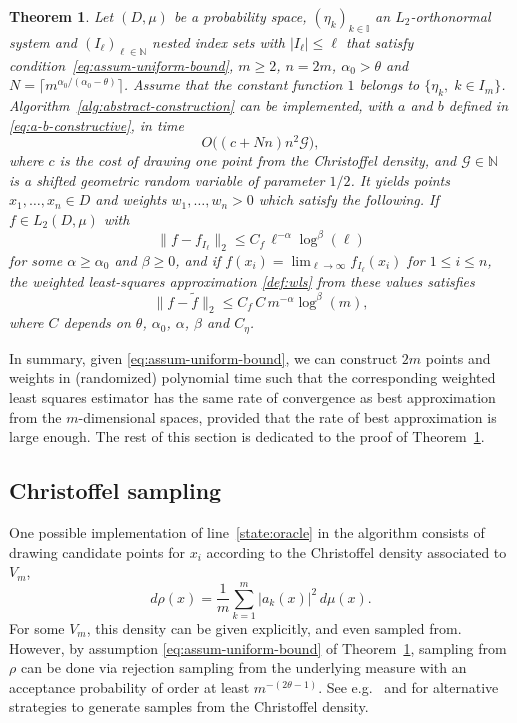 \documentclass[a4paper,11pt]{article}
\renewcommand{\(}{\left (}
\renewcommand{\)}{\right )}
\newcommand{\<}{\langle}
\renewcommand{\>}{\rangle}
\newcommand{\N}{\mathbb{N}}
\newcommand{\II}{\mathbb{I}}
\newtheorem{theorem}{Theorem}
\theoremstyle{definition}
\begin{document}
\begin{theorem}
\label{thm:constructive}
Let $(D,\mu)$ be a probability space, $(\eta_k)_{k\in\II}$ an $L_2$-orthonormal system and $(I_\ell)_{\ell\in\N}$ nested index sets with $|I_\ell|\le\ell$ that satisfy condition~\eqref{eq:assum-uniform-bound}, $m\geq 2$, $n=2 m$, $\alpha_0>\theta$ and $N=\lceil m^{\alpha_0/(\alpha_0-\theta)}\rceil$.
Assume that the constant function $1$ belongs to $\{\eta_k,\;k\in I_m\}$. Algorithm~\ref{alg:abstract-construction} can be implemented, with $a$ and $b$ defined in \eqref{eq:a-b-constructive}, in time
\[
O\big((c+Nn)n^2\mathcal G\big),
\]
where $c$ is the cost of drawing one point from the Christoffel density, and ${\mathcal G\in\N}$ is a shifted geometric random variable of parameter $1/2$. It yields points $x_1,\dots,x_n\in D$ and weights $w_1,\dots,w_n>0$ which satisfy the following.
If $f\in L_2(D,\mu)$ with
\[
\|f-f_{I_\ell}\|_2\leq C_f\, \ell^{-\alpha}\log^\beta(\ell)
\]
for some $\alpha\geq \alpha_0$ and $\beta\geq 0$, and if
$f(x_i)=\lim_{\ell\to\infty}f_{I_\ell}(x_i)$ for $1\leq i\leq n$,
the weighted least-squares approximation \eqref{def:wls}
from these values satisfies
\[
\|f-\tilde f\|_2\leq C_f\,C\, m^{-\alpha}\log^\beta(m),
\]
where $C$ depends on $\theta$, $\alpha_0$, $\alpha$, $\beta$ and $C_\eta$. 
\end{theorem}

In summary, given \eqref{eq:assum-uniform-bound},
we can construct $2m$ points and weights in (randomized) polynomial time
such that the corresponding weighted least squares estimator has the same rate of convergence as best approximation from the $m$-dimensional spaces, provided that the rate of best approximation is large enough.
The rest of this section is dedicated to the proof of Theorem~\ref{thm:constructive}.



\subsection{Christoffel sampling}
\label{subsec:Christoffel}

One possible implementation of line~\ref{state:oracle} in the algorithm consists of drawing candidate points for $x_{i}$ according to the Christoffel density associated to $V_m$,
\[
d\rho(x) = \frac{1}{m}\sum_{k=1}^m|a_k(x)|^2\,d\mu(x).
\]
For some $V_m$, this density can be given explicitly, and even sampled from. 
However, by assumption \eqref{eq:assum-uniform-bound} of Theorem~\ref{thm:constructive}, 
sampling from $\rho$ 
can be done via rejection sampling from the underlying measure with an acceptance probability of order at least $m^{-(2\theta-1)}$.
See e.g.~\cite[Sec.\,5]{CDdomains} and \cite{HA25} for alternative strategies 
to generate samples from the Christoffel density.
\end{document}
